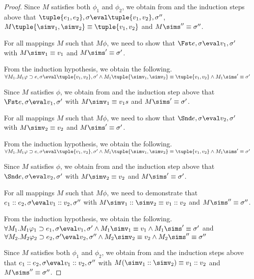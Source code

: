 \begin{proof}
{    Since $M$ satisfies both $\phi_1$ and $\phi_2$,
    we obtain from  and the induction steps above that $\tuple{e_1,e_2},\sigma\eval\tuple{v_1,v_2},\sigma''$, $M\tuple{\simv_1,\simv_2} \equiv \tuple{{v_1},{v_2}}$ and $M\sims''\equiv\sigma''$.
    }

{
  For all mappings $M$ such that $M\phi$, we need to show that
  $\Fst e,\sigma\eval v_1,\sigma'$ with
  $M \simv_1\equiv {v_1}$ and $M\sims'\equiv{\sigma'}$.

  From the induction hypothesis, we obtain the following.\\
  $\forall M_1 . M_1\phi \implies e,\sigma\eval\tuple{v_1,v_2},\sigma'\land M_1\tuple{\simv_1,\simv_2}\equiv \tuple{{v_1},{v_2}}\land M_1\sims'\equiv{\sigma'}$

  Since $M$ satisfies $\phi$,
  we obtain from  and the induction step above that $\Fst e,\sigma\eval v_1,\sigma'$ with $M \simv_1\equiv v_1s$ and $M\sims'\equiv\sigma'$.
  }

{
  For all mappings $M$ such that $M\phi$, we need to show that
  $\Snd e,\sigma\eval v_2,\sigma'$ with $M \simv_2\equiv {v_2}$ and $M\sims'\equiv{\sigma'}$.

  From the induction hypothesis, we obtain the following.\\
  $\forall M_1 . M_1\phi \implies e, \sigma \eval\tuple{{v_1},{v_2}},{\sigma'}\land M_1\tuple{\simv_1,\simv_2}\equiv \tuple{{v_1},{v_2}}\land M_1\sims'\equiv{\sigma'}$

  Since $M$ satisfies $\phi$,
  we obtain from  and the induction step above that $\Snd e,\sigma\eval v_2,\sigma'$ with
  $M \simv_2\equiv {v_2}$ and $M\sims'\equiv{\sigma'}$.
  }

  {
  For all mappings $M$ such that $M\phi$, we need to demonstrate that
  $e_1 :: e_2,\sigma\eval v_1 :: v_2,\sigma''$ with
  $M \simv_1::\simv_2\equiv v_1 :: v_2$ and $M\sims''\equiv \sigma''$.

  From the induction hypothesis, we obtain the following.\\
  $\forall M_1 .  M_1\phi_1 \implies e_1, \sigma \eval v_1, \sigma' \land  M_1\simv_1\equiv{v_1} \land  M_1\sims'\equiv{\sigma'}$ and
  $\forall M_2 . M_2\phi_2 \implies e_2,\sigma' \eval v_2,\sigma'' \land M_2\simv_2\equiv{v_2} \wedge M_2\sims''\equiv{\sigma''}$

  Since $M$ satisfies both $\phi_1$ and $\phi_2$,
  we obtain from  and the induction steps above that $e_1 :: e_2,\sigma\eval v_1 :: v_2,\sigma''$ with $M(\simv_1::\simv_2) \equiv {v_1}::{v_2}$ and $M \sims'' \equiv{\sigma''}$.
  }


\end{proof}
